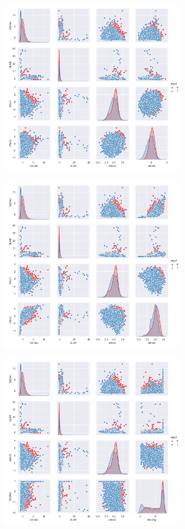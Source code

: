 \begin{figure}[h]
\centering
\includegraphics[width=0.7\textwidth]{output/figure_1.png}
\end{figure}
\begin{figure}[h]
\centering
\includegraphics[width=0.7\textwidth]{output/figure_2.png}
\end{figure}
\begin{figure}[h]
\centering
\includegraphics[width=0.7\textwidth]{output/figure_3.png}
\end{figure}
